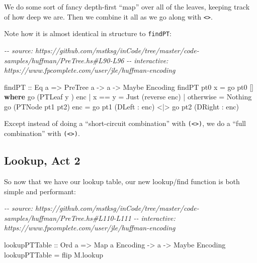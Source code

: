 \documentclass[]{article}
\newenvironment{Shaded}{}{}
\newcommand{\CommentTok}[1]{\textcolor[rgb]{0.38,0.63,0.69}{\textit{#1}}}
\newcommand{\DataTypeTok}[1]{\textcolor[rgb]{0.56,0.13,0.00}{#1}}
\newcommand{\FunctionTok}[1]{\textcolor[rgb]{0.02,0.16,0.49}{#1}}
\newcommand{\KeywordTok}[1]{\textcolor[rgb]{0.00,0.44,0.13}{\textbf{#1}}}
\newcommand{\NormalTok}[1]{#1}
\newcommand{\OperatorTok}[1]{\textcolor[rgb]{0.40,0.40,0.40}{#1}}
\newcommand{\OtherTok}[1]{\textcolor[rgb]{0.00,0.44,0.13}{#1}}
\begin{document}
We do some sort of fancy depth-first ``map'' over all of the leaves, keeping
track of how deep we are. Then we combine it all as we go along with
\texttt{\textless{}\textgreater{}}.

Note how it is almost identical in structure to \texttt{findPT}:

\begin{Shaded}
\begin{Highlighting}[]
\CommentTok{{-}{-} source: https://github.com/mstksg/inCode/tree/master/code{-}samples/huffman/PreTree.hs\#L90{-}L96}
\CommentTok{{-}{-} interactive: https://www.fpcomplete.com/user/jle/huffman{-}encoding}

\OtherTok{findPT ::} \DataTypeTok{Eq}\NormalTok{ a }\OtherTok{=\textgreater{}} \DataTypeTok{PreTree}\NormalTok{ a }\OtherTok{{-}\textgreater{}}\NormalTok{ a }\OtherTok{{-}\textgreater{}} \DataTypeTok{Maybe} \DataTypeTok{Encoding}
\NormalTok{findPT pt0 x }\OtherTok{=}\NormalTok{ go pt0 []}
  \KeywordTok{where}
\NormalTok{    go (}\DataTypeTok{PTLeaf}\NormalTok{ y      ) enc }\OperatorTok{|}\NormalTok{ x }\OperatorTok{==}\NormalTok{ y    }\OtherTok{=} \DataTypeTok{Just}\NormalTok{ (}\FunctionTok{reverse}\NormalTok{ enc)}
                            \OperatorTok{|} \FunctionTok{otherwise} \OtherTok{=} \DataTypeTok{Nothing}
\NormalTok{    go (}\DataTypeTok{PTNode}\NormalTok{ pt1 pt2) enc }\OtherTok{=}\NormalTok{ go pt1 (}\DataTypeTok{DLeft}  \OperatorTok{:}\NormalTok{ enc) }\OperatorTok{\textless{}|\textgreater{}}
\NormalTok{                              go pt2 (}\DataTypeTok{DRight} \OperatorTok{:}\NormalTok{ enc)}
\end{Highlighting}
\end{Shaded}

Except instead of doing a ``short-circuit combination'' with
\texttt{(\textless{}\textbar{}\textgreater{})}, we do a ``full combination''
with \texttt{(\textless{}\textgreater{})}.

\subsection{Lookup, Act 2}\label{lookup-act-2}

So now that we have our lookup table, our new lookup/find function is both
simple and performant:

\begin{Shaded}
\begin{Highlighting}[]
\CommentTok{{-}{-} source: https://github.com/mstksg/inCode/tree/master/code{-}samples/huffman/PreTree.hs\#L110{-}L111}
\CommentTok{{-}{-} interactive: https://www.fpcomplete.com/user/jle/huffman{-}encoding}

\OtherTok{lookupPTTable ::} \DataTypeTok{Ord}\NormalTok{ a }\OtherTok{=\textgreater{}} \DataTypeTok{Map}\NormalTok{ a }\DataTypeTok{Encoding} \OtherTok{{-}\textgreater{}}\NormalTok{ a }\OtherTok{{-}\textgreater{}} \DataTypeTok{Maybe} \DataTypeTok{Encoding}
\NormalTok{lookupPTTable }\OtherTok{=} \FunctionTok{flip}\NormalTok{ M.lookup}
\end{Highlighting}
\end{Shaded}
\end{document}
